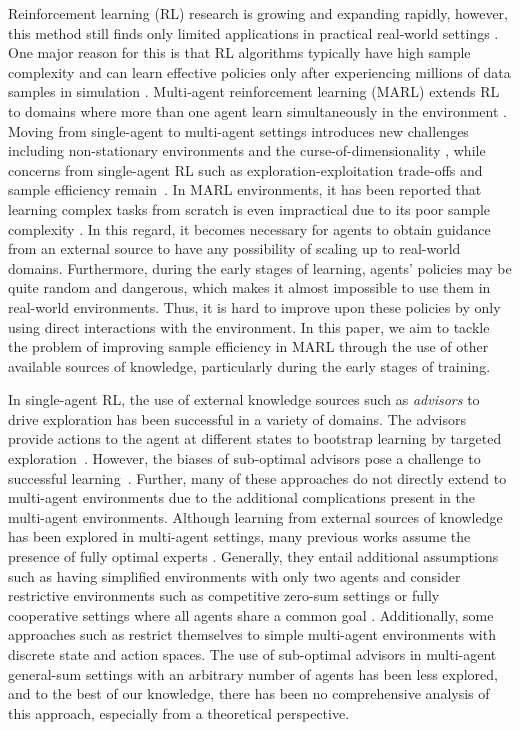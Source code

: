 \documentclass[jair, twoside,11pt,theapa]{article}
\begin{document}
Reinforcement learning (RL) research is growing and expanding rapidly, however, this method still finds only limited applications in practical real-world settings \citep{dulac2021challenges}. One major reason for this is that RL algorithms typically have high sample complexity and can learn effective policies only after experiencing millions of data samples in simulation \citep{kakade2003sample}. Multi-agent reinforcement learning (MARL) extends RL to domains where more than one agent learn simultaneously in the environment \citep{shoham2008multiagent}. Moving from single-agent to multi-agent settings introduces new challenges including non-stationary environments and the curse-of-dimensionality \citep{hernandez2019survey}, while concerns from single-agent RL such as exploration-exploitation trade-offs and sample efficiency remain~\citep{yogeswaran2012reinforcement}. In MARL environments, it has been reported that learning complex tasks from scratch is even impractical due to its poor sample complexity \citep{da2019survey}. In this regard, it becomes necessary for agents to obtain guidance from an external source to have any possibility of scaling up to real-world domains. Furthermore, during the early stages of learning, agents' policies may be quite random and dangerous, which makes it almost impossible to use them in real-world environments. Thus, it is hard to improve upon these policies by only using direct interactions with the environment. In this paper, we aim to tackle the problem of improving sample efficiency in MARL through the use of other available sources of knowledge, particularly during the early stages of training. 

In single-agent RL, the use of external knowledge sources such as \emph{advisors} to drive exploration has been successful in a variety of domains.  The advisors provide actions to the agent at different states to bootstrap learning by targeted exploration~\citep{nair2018overcoming}. However, the biases of sub-optimal advisors pose a challenge to successful learning~\citep{gao2018reinforcement}. Further, many of these approaches do not directly extend to multi-agent environments due to the additional complications present in the multi-agent environments. Although learning from external sources of knowledge has been explored in multi-agent settings, many previous works assume the presence of fully optimal experts \citep{natarajan2010multi, hadfield2016cooperative, yu2019multi}. Generally, they entail additional assumptions such as having simplified environments with only two agents \citep{lin2019multi} and consider restrictive environments such as  competitive zero-sum settings \citep{wang2018competitive} or fully cooperative settings where all agents  share a common goal \citep{natarajan2010multi, le2017coordinated, Peng2020}. Additionally, some approaches such as \cite{lin2019multi} restrict themselves to simple multi-agent environments with discrete state and action spaces. The use of sub-optimal advisors in multi-agent general-sum settings with an arbitrary number of agents has been less explored, and to the best of our knowledge, there has been no comprehensive analysis of this approach, especially from a theoretical perspective.
\end{document}
